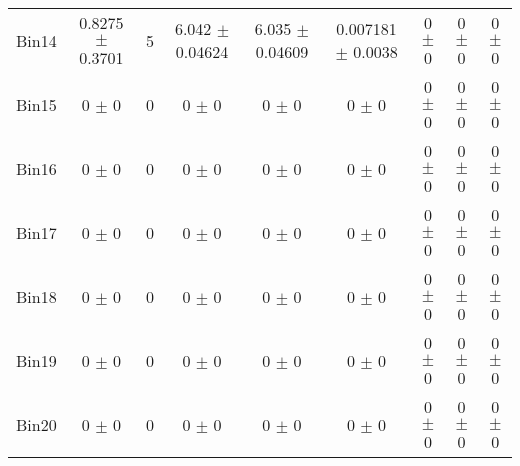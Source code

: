 \begin{tabular}{@{\extracolsep{4pt}}lcccccccc@{}}
     Bin14 & 0.8275 $\pm$ 0.3701 & 5 & 6.042 $\pm$ 0.04624 & 6.035 $\pm$ 0.04609 & 0.007181 $\pm$ 0.0038 & 0 $\pm$ 0 & 0 $\pm$ 0 & 0 $\pm$ 0 \\ 
     Bin15 & 0 $\pm$ 0 & 0 & 0 $\pm$ 0 & 0 $\pm$ 0 & 0 $\pm$ 0 & 0 $\pm$ 0 & 0 $\pm$ 0 & 0 $\pm$ 0 \\ 
     Bin16 & 0 $\pm$ 0 & 0 & 0 $\pm$ 0 & 0 $\pm$ 0 & 0 $\pm$ 0 & 0 $\pm$ 0 & 0 $\pm$ 0 & 0 $\pm$ 0 \\ 
     Bin17 & 0 $\pm$ 0 & 0 & 0 $\pm$ 0 & 0 $\pm$ 0 & 0 $\pm$ 0 & 0 $\pm$ 0 & 0 $\pm$ 0 & 0 $\pm$ 0 \\ 
     Bin18 & 0 $\pm$ 0 & 0 & 0 $\pm$ 0 & 0 $\pm$ 0 & 0 $\pm$ 0 & 0 $\pm$ 0 & 0 $\pm$ 0 & 0 $\pm$ 0 \\ 
     Bin19 & 0 $\pm$ 0 & 0 & 0 $\pm$ 0 & 0 $\pm$ 0 & 0 $\pm$ 0 & 0 $\pm$ 0 & 0 $\pm$ 0 & 0 $\pm$ 0 \\ 
     Bin20 & 0 $\pm$ 0 & 0 & 0 $\pm$ 0 & 0 $\pm$ 0 & 0 $\pm$ 0 & 0 $\pm$ 0 & 0 $\pm$ 0 & 0 $\pm$ 0 \\ 
\hline\hline
  \end{tabular}
